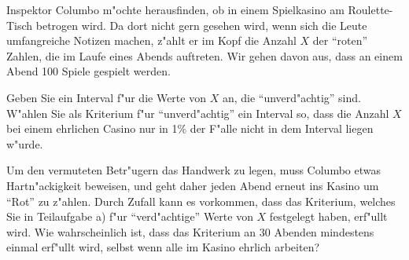 Inspektor Columbo m"ochte herausfinden, ob in einem Spielkasino
am Roulette-Tisch betrogen wird.
Da dort nicht gern gesehen wird, wenn sich die Leute umfangreiche Notizen
machen, z"ahlt er im Kopf die Anzahl $X$ der ``roten'' Zahlen,
die im Laufe eines Abends auftreten.
Wir gehen davon aus, dass an einem Abend 100 Spiele gespielt werden.
\begin{teilaufgaben}
\item Geben Sie ein Interval f"ur die Werte von $X$ an, die ``unverd"achtig''
sind. W"ahlen Sie als Kriterium f"ur ``unverd"achtig'' ein Interval so, dass
die Anzahl $X$ bei einem ehrlichen Casino nur in 1\% der F"alle nicht
in dem Interval liegen w"urde.
\item Um den vermuteten Betr"ugern das Handwerk zu legen, muss Columbo
etwas Hartn"ackigkeit beweisen, und geht daher jeden Abend erneut
ins Kasino um ``Rot'' zu z"ahlen. Durch Zufall kann es vorkommen, dass
das Kriterium, welches Sie in Teilaufgabe a) f"ur ``verd"achtige''
Werte von $X$ festgelegt haben, erf"ullt wird. Wie wahrscheinlich ist,
dass das Kriterium an 30 Abenden mindestens einmal erf"ullt wird, selbst
wenn alle im Kasino ehrlich arbeiten?
\end{teilaufgaben}

